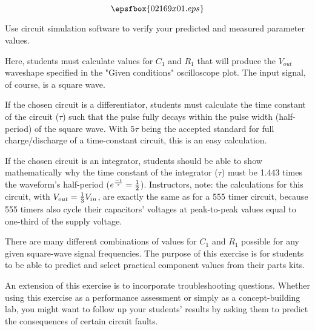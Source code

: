 

$$\epsfbox{02169x01.eps}$$

\vfil \eject






Use circuit simulation software to verify your predicted and measured parameter values.







Here, students must calculate values for $C_1$ and $R_1$ that will produce the $V_{out}$ waveshape specified in the "Given conditions" oscilloscope plot.  The input signal, of course, is a square wave.  

If the chosen circuit is a differentiator, students must calculate the time constant of the circuit ($\tau$) such that the pulse fully decays within the pulse width (half-period) of the square wave.  With $5 \tau$ being the accepted standard for full charge/discharge of a time-constant circuit, this is an easy calculation.

If the chosen circuit is an integrator, students should be able to show mathematically why the time constant of the integrator ($\tau$) must be 1.443 times the waveform's half-period ($e^{-t \over \tau} = {1 \over 2}$).  Instructors, note: the calculations for this circuit, with $V_{out} = {1 \over 3}V_{in}$, are exactly the same as for a 555 timer circuit, because 555 timers also cycle their capacitors' voltages at peak-to-peak values equal to one-third of the supply voltage.

There are many different combinations of values for $C_1$ and $R_1$ possible for any given square-wave signal frequencies.  The purpose of this exercise is for students to be able to predict and select practical component values from their parts kits.

An extension of this exercise is to incorporate troubleshooting questions.  Whether using this exercise as a performance assessment or simply as a concept-building lab, you might want to follow up your students' results by asking them to predict the consequences of certain circuit faults.




